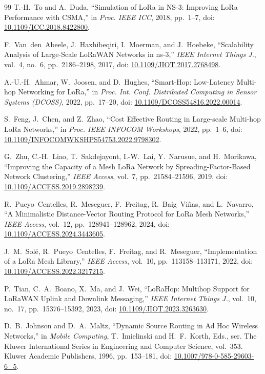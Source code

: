\documentclass[conference,letterpaper,10pt]{IEEEtran}
\begin{document}
\begin{thebibliography}{99}
T.-H.~To and A.~Duda,
``Simulation of LoRa in NS-3: Improving LoRa Performance with CSMA,''
in \emph{Proc. IEEE ICC}, 2018, pp.~1--7,
doi: \url{10.1109/ICC.2018.8422800}.

F.~Van~den~Abeele, J.~Haxhibeqiri, I.~Moerman, and J.~Hoebeke,
``Scalability Analysis of Large-Scale LoRaWAN Networks in ns-3,''
\emph{IEEE Internet Things J.}, vol.~4, no.~6, pp.~2186--2198, 2017,
doi: \url{10.1109/JIOT.2017.2768498}.

A.-U.-H.~Ahmar, W.~Joosen, and D.~Hughes,
``Smart-Hop: Low-Latency Multi-hop Networking for LoRa,''
in \emph{Proc. Int. Conf. Distributed Computing in Sensor Systems (DCOSS)}, 2022, pp.~17--20,
doi: \url{10.1109/DCOSS54816.2022.00014}.

S.~Feng, J.~Chen, and Z.~Zhao,
``Cost Effective Routing in Large-scale Multi-hop LoRa Networks,''
in \emph{Proc. IEEE INFOCOM Workshops}, 2022, pp.~1--6,
doi: \url{10.1109/INFOCOMWKSHPS54753.2022.9798302}.

G.~Zhu, C.-H.~Liao, T.~Sakdejayont, I.-W.~Lai, Y.~Narusue, and H.~Morikawa,
``Improving the Capacity of a Mesh LoRa Network by Spreading-Factor-Based Network Clustering,''
\emph{IEEE Access}, vol.~7, pp.~21584--21596, 2019,
doi: \url{10.1109/ACCESS.2019.2898239}.

R.~Pueyo~Centelles, R.~Meseguer, F.~Freitag, R.~Baig~Vi{\~n}as, and L.~Navarro,
``A Minimalistic Distance-Vector Routing Protocol for LoRa Mesh Networks,''
\emph{IEEE Access}, vol.~12, pp.~128941--128962, 2024,
doi: \url{10.1109/ACCESS.2024.3443605}.

J.~M.~Sol{\'e}, R.~Pueyo~Centelles, F.~Freitag, and R.~Meseguer,
``Implementation of a LoRa Mesh Library,''
\emph{IEEE Access}, vol.~10, pp.~113158--113171, 2022,
doi: \url{10.1109/ACCESS.2022.3217215}.

P.~Tian, C.~A.~Boano, X.~Ma, and J.~Wei,
``LoRaHop: Multihop Support for LoRaWAN Uplink and Downlink Messaging,''
\emph{IEEE Internet Things J.}, vol.~10, no.~17, pp.~15376--15392, 2023,
doi: \url{10.1109/JIOT.2023.3263630}.

D.~B.~Johnson and D.~A.~Maltz,
``Dynamic Source Routing in Ad Hoc Wireless Networks,''
in \emph{Mobile Computing}, T.~Imielinski and H.~F.~Korth, Eds.,
ser. The Kluwer International Series in Engineering and Computer Science,
vol.~353. Kluwer Academic Publishers, 1996, pp.~153--181,
doi: \url{10.1007/978-0-585-29603-6_5}.


\end{thebibliography}
\end{document}

